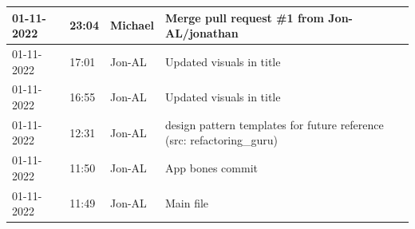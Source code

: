 \documentclass[11pt]{article}
\begin{document}
\begin{center}
\begin{longtable}{|p{2cm}|l|p{2cm}|p{10.5cm}|}
            01-11-2022                                 & 23:04                              & Michael                                 & Merge pull request \#1 from Jon-AL/jonathan                                                                                                                                                                                                                                                                  \\ \hline
            01-11-2022                                 & 17:01                              & Jon-AL                                  & Updated visuals in title                                                                                                                                                                                                                                                                                     \\ \hline
            01-11-2022                                 & 16:55                              & Jon-AL                                  & Updated visuals in title                                                                                                                                                                                                                                                                                     \\ \hline
            01-11-2022                                 & 12:31                              & Jon-AL                                  & design pattern templates for future reference (src: refactoring\_guru)                                                                                                                                                                                                                                       \\ \hline
            01-11-2022                                 & 11:50                              & Jon-AL                                  & App bones commit                                                                                                                                                                                                                                                                                             \\ \hline
            01-11-2022                                 & 11:49                              & Jon-AL                                  & Main file                                                                                                                                                                                                                                                                                                    \\ \hline

\end{longtable}
\end{center}
\end{document}
